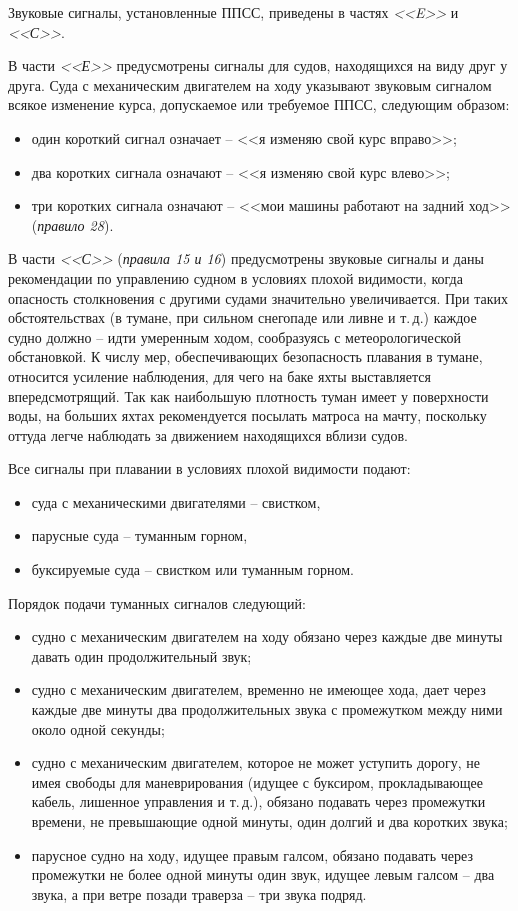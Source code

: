 \documentclass[a4paper, 12pt, twoside, final]{scrbook}
\begin{document}
Звуковые сигналы, установленные ППСС, приведены в частях \textit{<<E>>} и \textit{<<С>>}.

В части \textit{<<Е>>} предусмотрены сигналы для судов, находящихся на виду друг у друга. Суда с механическим двигателем на ходу указывают звуковым сигналом всякое изменение курса, допускаемое или требуемое ППСС, следующим образом:

\begin{itemize}
\item один короткий сигнал означает \--- <<я изменяю свой курс вправо>>;
\item два коротких сигнала означают \--- <<я изменяю свой курс влево>>;
\item три коротких сигнала означают \--- <<мои машины работают на задний ход>> (\textit{правило 28}).
\end{itemize}

В части \textit{<<С>>} (\textit{правила 15 и 16}) предусмотрены звуковые сигналы и даны рекомендации по управлению судном в условиях плохой видимости, когда опасность столкновения с другими судами значительно увеличивается. При таких обстоятельствах (в тумане, при сильном снегопаде или ливне и т.\,д.) каждое судно должно \--- идти умеренным ходом, сообразуясь с метеорологической обстановкой. К числу мер, обеспечивающих безопасность плавания в тумане, относится усиление наблюдения, для чего на баке яхты выставляется впередсмотрящий. Так как наибольшую плотность туман имеет у поверхности воды, на больших яхтах рекомендуется посылать матроса на мачту, поскольку оттуда легче наблюдать за движением находящихся вблизи судов.

Все сигналы при плавании в условиях плохой видимости подают:

\begin{itemize}
\item суда с механическими двигателями \--- свистком,
\item парусные суда \--- туманным горном,
\item буксируемые суда \--- свистком или туманным горном.
\end{itemize}

Порядок подачи туманных сигналов следующий:

\begin{itemize}
\item судно с механическим двигателем на ходу обязано через каждые две минуты давать один продолжительный звук;
\item судно с механическим двигателем, временно не имеющее хода, дает через каждые две минуты два продолжительных звука с промежутком между ними около одной секунды;
\item судно с механическим двигателем, которое не может уступить дорогу, не имея свободы для маневрирования (идущее с буксиром, прокладывающее кабель, лишенное управления и т.\,д.), обязано подавать через промежутки времени, не превышающие одной минуты, один долгий и два коротких звука;
\item парусное судно на ходу, идущее правым галсом, обязано подавать через промежутки не более одной минуты один звук, идущее левым галсом \--- два звука, а при ветре позади    траверза \--- три звука подряд.
\end{itemize}
\end{document}
